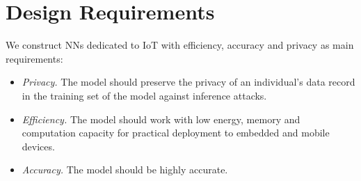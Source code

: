 \section{Design Requirements}\label{design}

We construct NNs dedicated to IoT with efficiency, accuracy and privacy as main requirements:

\begin{itemize}[leftmargin=*]

\item {\em Privacy.}
The model should preserve the privacy of an individual's data record in the training set of the model against inference attacks.

\item {\em Efficiency.}
The model should work with low energy, memory and computation capacity for practical deployment to embedded and mobile devices.

\item {\em Accuracy.}
The model should be highly accurate.
\end{itemize}
